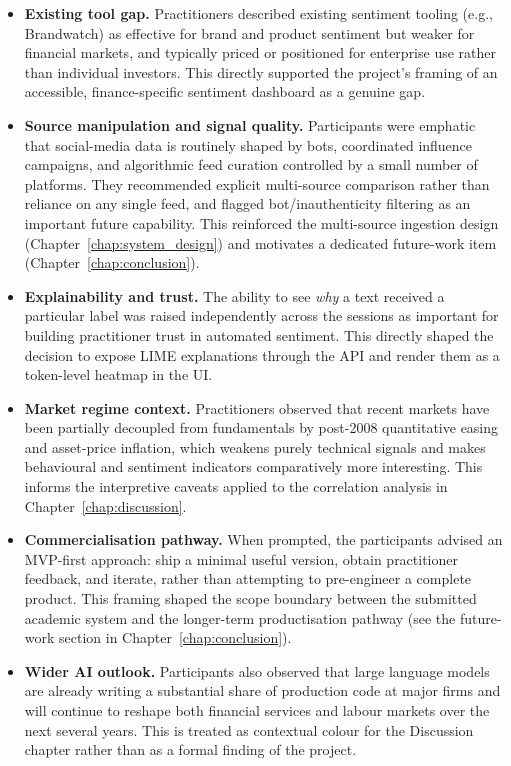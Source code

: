 \begin{itemize}
  \item \textbf{Existing tool gap.} Practitioners described existing sentiment tooling (e.g., Brandwatch) as effective for brand and product sentiment but weaker for financial markets, and typically priced or positioned for enterprise use rather than individual investors. This directly supported the project's framing of an accessible, finance-specific sentiment dashboard as a genuine gap.
  \item \textbf{Source manipulation and signal quality.} Participants were emphatic that social-media data is routinely shaped by bots, coordinated influence campaigns, and algorithmic feed curation controlled by a small number of platforms. They recommended explicit multi-source comparison rather than reliance on any single feed, and flagged bot/inauthenticity filtering as an important future capability. This reinforced the multi-source ingestion design (Chapter~\ref{chap:system_design}) and motivates a dedicated future-work item (Chapter~\ref{chap:conclusion}).
  \item \textbf{Explainability and trust.} The ability to see \emph{why} a text received a particular label was raised independently across the sessions as important for building practitioner trust in automated sentiment. This directly shaped the decision to expose LIME explanations through the API and render them as a token-level heatmap in the UI.
  \item \textbf{Market regime context.} Practitioners observed that recent markets have been partially decoupled from fundamentals by post-2008 quantitative easing and asset-price inflation, which weakens purely technical signals and makes behavioural and sentiment indicators comparatively more interesting. This informs the interpretive caveats applied to the correlation analysis in Chapter~\ref{chap:discussion}.
  \item \textbf{Commercialisation pathway.} When prompted, the participants advised an MVP-first approach: ship a minimal useful version, obtain practitioner feedback, and iterate, rather than attempting to pre-engineer a complete product. This framing shaped the scope boundary between the submitted academic system and the longer-term productisation pathway (see the future-work section in Chapter~\ref{chap:conclusion}).
  \item \textbf{Wider AI outlook.} Participants also observed that large language models are already writing a substantial share of production code at major firms and will continue to reshape both financial services and labour markets over the next several years. This is treated as contextual colour for the Discussion chapter rather than as a formal finding of the project.
\end{itemize}


